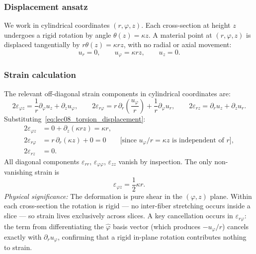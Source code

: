 \documentclass[../main.tex]{subfiles}
\begin{document}
\subsubsection*{Displacement ansatz}

We work in cylindrical coordinates $(r, \varphi, z)$. Each cross-section at height $z$ undergoes a rigid rotation by angle $\theta(z) = \kappa z$. A material point at $(r, \varphi, z)$ is displaced tangentially by $r\theta(z) = \kappa r z$, with no radial or axial movement:
\begin{equation}
    u_r = 0, \qquad u_\varphi = \kappa r z, \qquad u_z = 0.
    \label{eq:lec08_torsion_displacement}
\end{equation}

\subsubsection*{Strain calculation}

The relevant off-diagonal strain components in cylindrical coordinates are:
\[
    2\varepsilon_{\varphi z} = \frac{1}{r}\partial_\varphi u_z + \partial_z u_\varphi,
    \qquad
    2\varepsilon_{r\varphi} = r\,\partial_r\!\left(\frac{u_\varphi}{r}\right) + \frac{1}{r}\partial_\varphi u_r,
    \qquad
    2\varepsilon_{rz} = \partial_r u_z + \partial_z u_r.
\]
Substituting~\eqref{eq:lec08_torsion_displacement}:
\begin{align*}
    2\varepsilon_{\varphi z} &= 0 + \partial_z(\kappa r z) = \kappa r, \\
    2\varepsilon_{r\varphi} &= r\,\partial_r(\kappa z) + 0 = 0
    \qquad\bigl[\text{since }u_\varphi/r = \kappa z\text{ is independent of }r\bigr], \\
    2\varepsilon_{rz} &= 0.
\end{align*}
All diagonal components $\varepsilon_{rr}$, $\varepsilon_{\varphi\varphi}$, $\varepsilon_{zz}$ vanish by inspection. The only non-vanishing strain is
\begin{equation}
    \boxed{\varepsilon_{\varphi z} = \frac{1}{2}\kappa r.}
    \label{eq:lec08_torsion_strain}
\end{equation}
\textit{Physical significance:} The deformation is pure shear in the $(\varphi, z)$ plane. Within each cross-section the rotation is rigid — no inter-fiber stretching occurs inside a slice — so strain lives exclusively across slices. A key cancellation occurs in $\varepsilon_{r\varphi}$: the term from differentiating the $\hat{\varphi}$ basis vector (which produces $-u_\varphi/r$) cancels exactly with $\partial_r u_\varphi$, confirming that a rigid in-plane rotation contributes nothing to strain.
\end{document}
